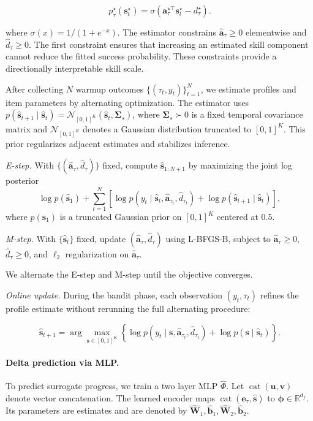 \documentclass{article} %
\begin{document}
\[
    p_\tau^\star(\mathbf{s}_t^\star)=\sigma\!\left(\mathbf{a}_\tau^{\star\top}\mathbf{s}_t^\star-d_\tau^\star\right).
\]

where \(\sigma(x)=1/(1+e^{-x})\). The estimator constrains \(\widehat{\mathbf{a}}_\tau\geq0\) elementwise and \(\widehat d_\tau\geq0\). The first constraint ensures that increasing an estimated skill component cannot reduce the fitted success probability. These constraints provide a directionally interpretable skill scale.

After collecting \(N\) warmup outcomes \(\{(\tau_t,y_t)\}_{t=1}^N\), we estimate profiles and item parameters by alternating optimization. The estimator uses \(p(\widehat{\mathbf{s}}_{t+1}\mid\widehat{\mathbf{s}}_t)=\mathcal{N}_{[0,1]^K}(\widehat{\mathbf{s}}_t,\boldsymbol{\Sigma}_s)\), where \(\boldsymbol{\Sigma}_s\succ0\) is a fixed temporal covariance matrix and \(\mathcal{N}_{[0,1]^K}\) denotes a Gaussian distribution truncated to \([0,1]^K\). This prior regularizes adjacent estimates and stabilizes inference.

\textit{E-step.} With \(\{(\widehat{\mathbf{a}}_\tau,\widehat d_\tau)\}\) fixed, compute \(\widehat{\mathbf{s}}_{1:N+1}\) by maximizing the joint log posterior
\[
\log p(\widehat{\mathbf{s}}_1) + \sum_{t=1}^{N}\left[\log p(y_t\mid\widehat{\mathbf{s}}_t,\widehat{\mathbf{a}}_{\tau_t},\widehat d_{\tau_t}) + \log p(\widehat{\mathbf{s}}_{t+1}\mid\widehat{\mathbf{s}}_t)\right],
\]
where \(p(\mathbf{s}_1)\) is a truncated Gaussian prior on \([0,1]^K\) centered at \(0.5\).

\textit{M-step.} With \(\{\widehat{\mathbf{s}}_t\}\) fixed, update \((\widehat{\mathbf{a}}_\tau,\widehat d_\tau)\) using L-BFGS-B, subject to \(\widehat{\mathbf{a}}_\tau\geq0\), \(\widehat d_\tau\geq0\), and \(\ell_2\) regularization on \(\widehat{\mathbf{a}}_\tau\).

We alternate the E-step and M-step until the objective converges.

\textit{Online update.} During the bandit phase, each observation \((y_t,\tau_t)\) refines the profile estimate without rerunning the full alternating procedure:

\[
    \widehat{\mathbf{s}}_{t+1}=\arg\max_{\mathbf{s}\in[0,1]^K}\left\{\log p(y_t\mid\mathbf{s},\widehat{\mathbf{a}}_{\tau_t},\widehat d_{\tau_t})+\log p(\mathbf{s}\mid\widehat{\mathbf{s}}_t)\right\}.
\]



\paragraph{Delta prediction via MLP.}
To predict surrogate progress, we train a two layer MLP \(\widehat\Phi\). Let \(\operatorname{cat}(\mathbf{u},\mathbf{v})\) denote vector concatenation. The learned encoder maps \(\operatorname{cat}(\mathbf{e}_\tau,\widehat{\mathbf{s}})\) to \(\boldsymbol{\phi}\in\mathbb{R}^{d_f}\). Its parameters are estimates and are denoted by \(\widehat{\mathbf{W}}_1,\widehat{\mathbf{b}}_1,\widehat{\mathbf{W}}_2,\widehat{\mathbf{b}}_2\).
\end{document}
